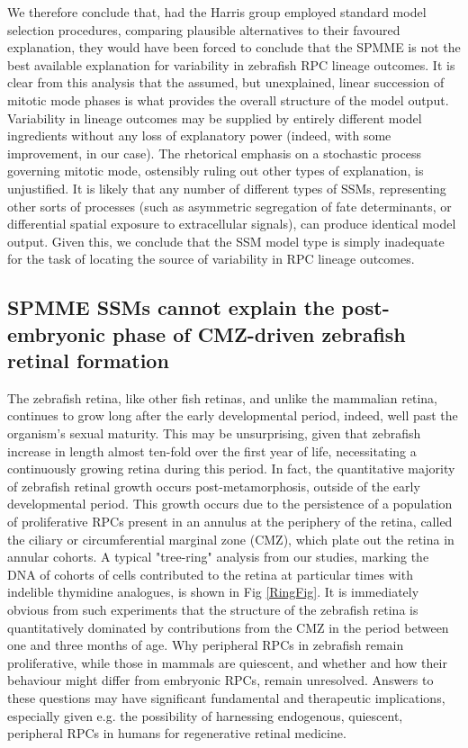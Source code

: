 \documentclass[10pt,letterpaper]{article}
\begin{document}
We therefore conclude that, had the Harris group employed standard model selection procedures, comparing plausible alternatives to their favoured explanation, they would have been forced to conclude that the SPMME is not the best available explanation for variability in zebrafish RPC lineage outcomes. It is clear from this analysis that the assumed, but unexplained, linear succession of mitotic mode phases is what provides the overall structure of the model output. Variability in lineage outcomes may be supplied by entirely different model ingredients without any loss of explanatory power (indeed, with some improvement, in our case). The rhetorical emphasis on a stochastic process governing mitotic mode, ostensibly ruling out other types of explanation, is unjustified. It is likely that any number of different types of SSMs, representing other sorts of processes (such as asymmetric segregation of fate determinants, or differential spatial exposure to extracellular signals), can produce identical model output. Given this, we conclude that the SSM model type is simply inadequate for the task of locating the source of variability in RPC lineage outcomes.

\subsection*{SPMME SSMs cannot explain the post-embryonic phase of CMZ-driven zebrafish retinal formation}

The zebrafish retina, like other fish retinas, and unlike the mammalian retina, continues to grow long after the early developmental period, indeed, well past the organism's sexual maturity. This may be unsurprising, given that zebrafish increase in length almost ten-fold over the first year of life\cite{Parichy2009}, necessitating a continuously growing retina during this period. In fact, the quantitative majority of zebrafish retinal growth occurs post-metamorphosis, outside of the early developmental period. This growth occurs due to the persistence of a population of proliferative RPCs present in an annulus at the periphery of the retina, called the ciliary or circumferential marginal zone (CMZ), which plate out the retina in annular cohorts. A typical "tree-ring" analysis from our studies, marking the DNA of cohorts of cells contributed to the retina at particular times with indelible thymidine analogues, is shown in Fig \ref{RingFig}. It is immediately obvious from such experiments that the structure of the zebrafish retina is quantitatively dominated by contributions from the CMZ in the period between one and three months of age. Why peripheral RPCs in zebrafish remain proliferative, while those in mammals are quiescent\cite{Tropepe2000}, and whether and how their behaviour might differ from embryonic RPCs, remain unresolved. Answers to these questions may have significant fundamental and therapeutic implications, especially given e.g. the possibility of harnessing endogenous, quiescent, peripheral RPCs in humans for regenerative retinal medicine.
\end{document}
